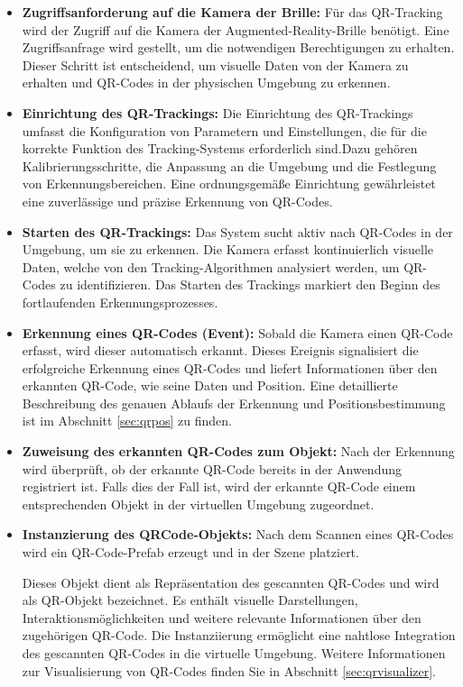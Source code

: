 \begin{itemize}
\begin{itemize}
    \item \textbf{Zugriffsanforderung auf die Kamera der Brille:}
    Für das QR-Tracking wird der Zugriff auf die Kamera der Augmented-Reality-Brille benötigt. Eine Zugriffsanfrage wird
    gestellt, um die notwendigen Berechtigungen zu erhalten. Dieser Schritt ist entscheidend, um visuelle Daten von der Kamera
    zu erhalten und QR-Codes in der physischen Umgebung zu erkennen.

    \item \textbf{Einrichtung des QR-Trackings:}
    Die Einrichtung des QR-Trackings umfasst die Konfiguration von Parametern und Einstellungen, die für die korrekte
    Funktion des Tracking-Systems erforderlich sind.Dazu gehören Kalibrierungsschritte, die Anpassung an die Umgebung und die
    Festlegung von Erkennungsbereichen. Eine ordnungsgemäße Einrichtung gewährleistet eine zuverlässige und präzise Erkennung von QR-Codes.

    \item \textbf{Starten des QR-Trackings:}
    Das System sucht aktiv nach QR-Codes in der Umgebung, um sie zu erkennen. Die Kamera erfasst kontinuierlich visuelle
    Daten, welche von den Tracking-Algorithmen analysiert werden, um QR-Codes zu identifizieren. Das Starten des Trackings
    markiert den Beginn des fortlaufenden Erkennungsprozesses.

    \item \textbf{Erkennung eines QR-Codes (Event):}
    Sobald die Kamera einen QR-Code erfasst, wird dieser automatisch erkannt. Dieses Ereignis signalisiert die erfolgreiche Erkennung eines QR-Codes und liefert Informationen über den erkannten QR-Code, wie seine Daten und Position. Eine detaillierte Beschreibung des genauen Ablaufs der Erkennung und Positionsbestimmung ist im Abschnitt \ref{sec:qrpos} zu finden.

    \item \textbf{Zuweisung des erkannten QR-Codes zum Objekt:}
    Nach der Erkennung wird überprüft, ob der erkannte QR-Code bereits in der Anwendung registriert ist. Falls dies der Fall
    ist, wird der erkannte QR-Code einem entsprechenden Objekt in der virtuellen Umgebung zugeordnet.

    \item \textbf{Instanzierung des QRCode-Objekts:}
    Nach dem Scannen eines QR-Codes wird ein QR-Code-Prefab erzeugt und in der Szene platziert.

    Dieses Objekt dient als Repräsentation des gescannten QR-Codes und wird als QR-Objekt bezeichnet. Es enthält visuelle
    Darstellungen, Interaktionsmöglichkeiten und weitere relevante Informationen über den zugehörigen QR-Code. Die Instanziierung
    ermöglicht eine nahtlose Integration des gescannten QR-Codes in die virtuelle Umgebung. Weitere Informationen zur Visualisierung
    von QR-Codes finden Sie in Abschnitt \ref{sec:qrvisualizer}.


\end{itemize}
\end{itemize}
